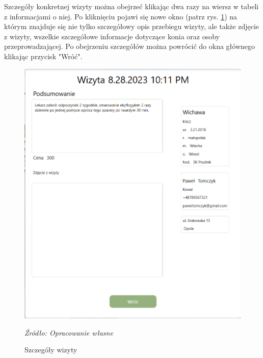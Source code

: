 \documentclass[12pt,oneside]{report}
\begin{document}
Szczegóły konkretnej wizyty można obejrzeć klikając dwa razy na wiersz w tabeli z informacjami o niej. Po kliknięciu pojawi się nowe okno (patrz rys. \ref{WizytyDetale}) na którym znajduje się nie tylko szczegółowy opis przebiegu wizyty, ale także zdjęcie z wizyty, wszelkie szczegółowe informacje dotyczące konia oraz osoby przeprowadzającej. Po obejrzeniu szczegółów można powrócić do okna głównego klikając przycisk "Wróć".
\begin{figure}
	\begin{center}
		\begin{minipage}{6cm}
			\centering
			\includegraphics[scale=0.4]{wizytyDetale}
			\caption{Szczegóły wizyty}
			\textit{Źródło: Opracowanie własne}
			\label{WizytyDetale}
		\end{minipage}
		\hfil
		\begin{minipage}{6cm}
			\centering

\end{minipage}
\end{center}
\end{figure}
\end{document}
